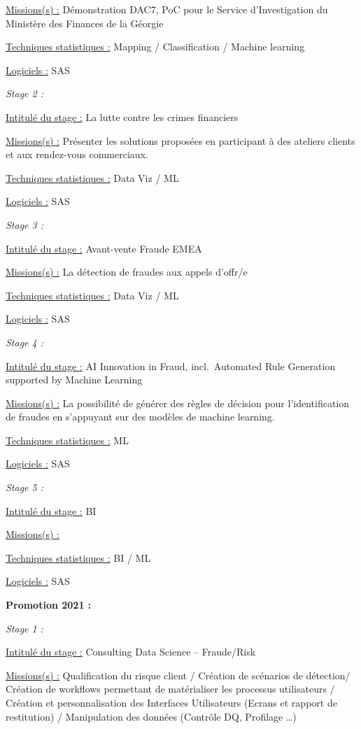 \documentclass[
  letterpaper,
  DIV=11,
  numbers=noendperiod]{scrreprt}
\begin{document}
\uline{Missions(s) :} Démonstration DAC7, PoC pour le Service
d'Investigation du Ministère des Finances de la Géorgie

\uline{Techniques statistiques :} Mapping / Classification / Machine
learning

\uline{Logiciels :} SAS

\emph{Stage 2 :}

\uline{Intitulé du stage :} La lutte contre les crimes financiers

\uline{Missions(s) :} Présenter les solutions proposées en participant à
des ateliers clients et aux rendez-vous commerciaux.

\uline{Techniques statistiques :} Data Viz / ML

\uline{Logiciels :} SAS

\emph{Stage 3 :}

\uline{Intitulé du stage :} Avant-vente Fraude EMEA

\uline{Missions(s) :} La détection de fraudes aux appels d'offr/e

\uline{Techniques statistiques :} Data Viz / ML

\uline{Logiciels :} SAS

\emph{Stage 4 :}

\uline{Intitulé du stage :} AI Innovation in Fraud, incl.~Automated Rule
Generation supported by Machine Learning

\uline{Missions(s) :} La possibilité de générer des règles de décision
pour l'identification de fraudes en s'appuyant sur des modèles de
machine learning.

\uline{Techniques statistiques :} ML

\uline{Logiciels :} SAS

\emph{Stage 5 :}

\uline{Intitulé du stage :} BI

\uline{Missions(s) :}

\uline{Techniques statistiques :} BI / ML

\uline{Logiciels :} SAS

\textbf{Promotion 2021 :}

\emph{Stage 1 :}

\uline{Intitulé du stage :} Consulting Data Science -- Fraude/Risk

\uline{Missions(s) :} Qualification du risque client / Création de
scénarios de détection/ Création de workflows permettant de matérialiser
les processus utilisateurs / Création et personnalisation des Interfaces
Utilisateurs (Ecrans et rapport de restitution) / Manipulation des
données (Contrôle DQ, Profilage \ldots)
\end{document}
